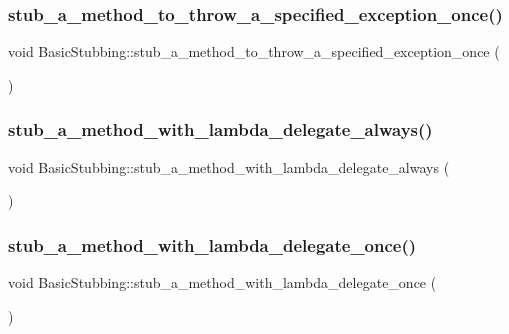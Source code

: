 \subsubsection{\texorpdfstring{stub\_a\_method\_to\_throw\_a\_specified\_exception\_once()}{stub\_a\_method\_to\_throw\_a\_specified\_exception\_once()}}
{\footnotesize\ttfamily void Basic\+Stubbing\+::stub\+\_\+a\+\_\+method\+\_\+to\+\_\+throw\+\_\+a\+\_\+specified\+\_\+exception\+\_\+once (\begin{DoxyParamCaption}{ }\end{DoxyParamCaption})\hspace{0.3cm}{\ttfamily [inline]}}

\mbox{\label{structBasicStubbing_a97bcfabd427f34fc7e146dc98e78f1de}} 
\subsubsection{\texorpdfstring{stub\_a\_method\_with\_lambda\_delegate\_always()}{stub\_a\_method\_with\_lambda\_delegate\_always()}}
{\footnotesize\ttfamily void Basic\+Stubbing\+::stub\+\_\+a\+\_\+method\+\_\+with\+\_\+lambda\+\_\+delegate\+\_\+always (\begin{DoxyParamCaption}{ }\end{DoxyParamCaption})\hspace{0.3cm}{\ttfamily [inline]}}

\mbox{\label{structBasicStubbing_aed48703d5d8b140e1d5c815647031102}} 
\subsubsection{\texorpdfstring{stub\_a\_method\_with\_lambda\_delegate\_once()}{stub\_a\_method\_with\_lambda\_delegate\_once()}}
{\footnotesize\ttfamily void Basic\+Stubbing\+::stub\+\_\+a\+\_\+method\+\_\+with\+\_\+lambda\+\_\+delegate\+\_\+once (\begin{DoxyParamCaption}{ }\end{DoxyParamCaption})\hspace{0.3cm}{\ttfamily [inline]}}

